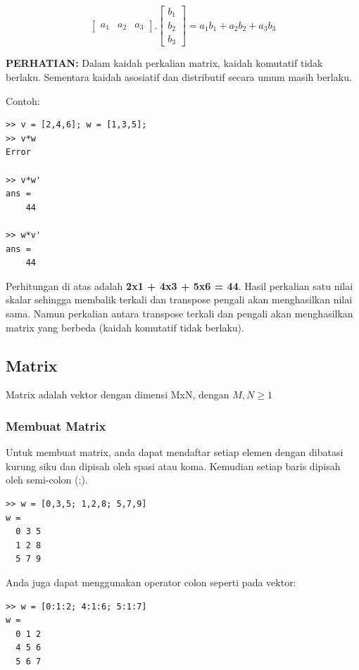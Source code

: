 \documentclass[12pt]{book}
\begin{document}
	\[
	\begin{bmatrix}
		a_1 & a_2 & a_3
	\end{bmatrix}
	.
	\begin{bmatrix}
		b_1 \\
		b_2 \\
		b_3
	\end{bmatrix}
	=
	a_{1}b_{1} + a_{2}b_{2} + a_{3}b_{3}
	\]

	\textbf{PERHATIAN:} Dalam kaidah perkalian matrix, kaidah komutatif tidak berlaku.
	Sementara kaidah asosiatif dan distributif secara umum masih berlaku.

	Contoh:
	\begin{verbatim}
>> v = [2,4,6]; w = [1,3,5];
>> v*w
Error

>> v*w'
ans =
    44

>> w*v'
ans =
    44
	\end{verbatim}

	Perhitungan di atas adalah \textbf{2x1 + 4x3 + 5x6 = 44}.
	Hasil perkalian satu nilai skalar sehingga membalik terkali dan transpose pengali akan menghasilkan nilai sama.
	Namun perkalian antara transpose terkali dan pengali akan menghasilkan matrix yang berbeda (kaidah komutatif tidak berlaku).

	\subsection{Matrix}

	Matrix adalah vektor dengan dimensi MxN, dengan $M,N \geq 1$

	\subsubsection{Membuat Matrix}

	Untuk membuat matrix, anda dapat mendaftar setiap elemen dengan dibatasi kurung siku dan dipisah oleh spasi atau koma.
	Kemudian setiap baris dipisah oleh semi-colon (;).
	\begin{verbatim}
>> w = [0,3,5; 1,2,8; 5,7,9]
w =
  0 3 5
  1 2 8
  5 7 9
	\end{verbatim}

	Anda juga dapat menggunakan operator colon seperti pada vektor:
	\begin{verbatim}
>> w = [0:1:2; 4:1:6; 5:1:7]
w =
  0 1 2
  4 5 6
  5 6 7
	\end{verbatim}
\end{document}
